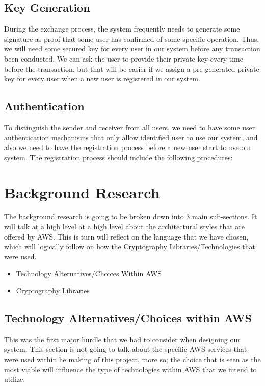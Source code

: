 \documentclass[runningheads]{llncs}
\begin{document}
\subsection{Key Generation}
During the exchange process, the system frequently needs to generate some signature as proof that some user has confirmed of some specific operation. Thus, we will need some secured key for every user in our system before any transaction been conducted. We can ask the user to provide their private key every time before the transaction, but that will be easier if we assign a pre-generated private key for every user when a new user is registered in our system.

\subsection{Authentication}
To distinguish the sender and receiver from all users, we need to have some user authentication mechanisms that only allow identified user to use our system, and also we need to have the registration process before a new user start to use our system. The registration process should include the following procedures:


\section{Background Research} 
The background research is going to be broken down into 3 main sub-sections. It will talk at a high level at a high level about the architectural styles that are offered by AWS. This is turn will reflect on the language that we have chosen, which will logically follow on how the Cryptography Libraries/Technologies that were used.
\begin{itemize}
	\item Technology Alternatives/Choices Within AWS
	\item Cryptography Libraries
\end{itemize}

\subsection{Technology Alternatives/Choices within AWS}
This was the first major hurdle that we had to consider when designing our system. This section is not going to talk about the specific AWS services that were used within he making of this project, more so; the choice that is seen as the most viable will influence the type of technologies within AWS that we intend to utilize. 
\end{document}

